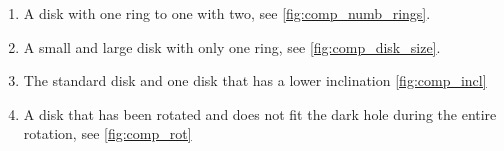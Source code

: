 \begin{enumerate}
\item A disk with one ring to one with two, see \autoref{fig:comp_numb_rings}.
\item A small and large disk with only one ring, see \autoref{fig:comp_disk_size}. 
\item The standard disk and one disk that has a lower inclination \autoref{fig:comp_incl}
\item A disk that has been rotated and does not fit the dark hole during the entire rotation, see \autoref{fig:comp_rot}
\end{enumerate}

\begin{table}
    \caption{An overview of all the disks we look at. If a disk has multiple rings their inner and outer dimensions are listed on different lines.}
\end{table}
